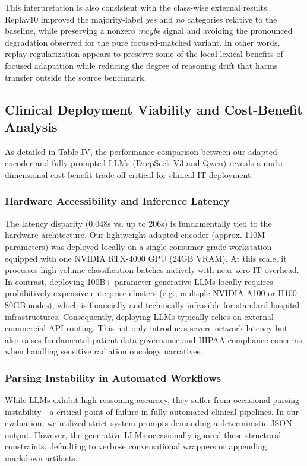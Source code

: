 \documentclass[a4paper,fleqn]{cas-dc}
\begin{document}
This interpretation is also consistent with the class-wise external results. Replay10 improved the majority-label \textit{yes} and \textit{no} categories relative to the baseline, while preserving a nonzero \textit{maybe} signal and avoiding the pronounced degradation observed for the pure focused-matched variant. In other words, replay regularization appears to preserve some of the local lexical benefits of focused adaptation while reducing the degree of reasoning drift that harms transfer outside the source benchmark.

\subsection{Clinical Deployment Viability and Cost-Benefit Analysis}
As detailed in Table IV, the performance comparison between our adapted encoder and fully prompted LLMs (DeepSeek-V3 and Qwen) reveals a multi-dimensional cost-benefit trade-off critical for clinical IT deployment.

\subsubsection{Hardware Accessibility and Inference Latency}
The latency disparity (0.048s vs. up to 206s) is fundamentally tied to the hardware architecture. Our lightweight adapted encoder (approx. 110M parameters) was deployed locally on a single consumer-grade workstation equipped with one NVIDIA RTX-4090 GPU (24GB VRAM). At this scale, it processes high-volume classification batches natively with near-zero IT overhead. In contrast, deploying 100B+ parameter generative LLMs locally requires prohibitively expensive enterprise clusters (e.g., multiple NVIDIA A100 or H100 80GB nodes), which is financially and technically infeasible for standard hospital infrastructures. Consequently, deploying LLMs typically relies on external commercial API routing. This not only introduces severe network latency but also raises fundamental patient data governance and HIPAA compliance concerns when handling sensitive radiation oncology narratives.

\subsubsection{Parsing Instability in Automated Workflows}
While LLMs exhibit high reasoning accuracy, they suffer from occasional parsing instability—a critical point of failure in fully automated clinical pipelines. In our evaluation, we utilized strict system prompts demanding a deterministic JSON output. However, the generative LLMs occasionally ignored these structural constraints, defaulting to verbose conversational wrappers or appending markdown artifacts.
\end{document}
